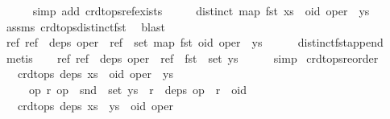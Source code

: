 \begin{isabellebody}
\ \ \ \ \isamarkupfalse%
\ {\isacharparenleft}simp\ add{\isacharcolon}\ crdt{\isacharunderscore}ops{\isacharunderscore}ref{\isacharunderscore}exists{\isacharparenright}\isanewline
\ \ \isamarkupfalse%
\ \isamarkupfalse%
\ {\isachardoublequoteopen}distinct\ {\isacharparenleft}map\ fst\ {\isacharparenleft}xs\ {\isacharat}\ {\isacharbrackleft}{\isacharparenleft}oid{\isacharcomma}\ oper{\isacharparenright}{\isacharbrackright}\ {\isacharat}\ ys{\isacharparenright}{\isacharparenright}{\isachardoublequoteclose}\isanewline
\ \ \ \ \isamarkupfalse%
\ assms\ crdt{\isacharunderscore}ops{\isacharunderscore}distinct{\isacharunderscore}fst\ \isamarkupfalse%
\ blast\isanewline
\ \ \isamarkupfalse%
\ \isamarkupfalse%
\ {\isachardoublequoteopen}{\isasymAnd}ref{\isachardot}\ ref\ {\isasymin}\ deps\ oper\ {\isasymLongrightarrow}\ ref\ {\isasymnotin}\ set\ {\isacharparenleft}map\ fst\ {\isacharparenleft}{\isacharbrackleft}{\isacharparenleft}oid{\isacharcomma}\ oper{\isacharparenright}{\isacharbrackright}\ {\isacharat}\ ys{\isacharparenright}{\isacharparenright}{\isachardoublequoteclose}\isanewline
\ \ \ \ \isamarkupfalse%
\ distinct{\isacharunderscore}fst{\isacharunderscore}append\ \isamarkupfalse%
\ metis\isanewline
\ \ \isamarkupfalse%
\ {\isachardoublequoteopen}{\isasymAnd}ref{\isachardot}\ ref\ {\isasymin}\ deps\ oper\ {\isasymLongrightarrow}\ ref\ {\isasymnotin}\ fst\ {\isacharbackquote}\ set\ ys{\isachardoublequoteclose}\isanewline
\ \ \ \ \isamarkupfalse%
\ simp\isanewline
{}\isamarkupfalse%
%
\endisatagproof
{\isafoldproof}%
%
\isadelimproof
\isanewline
%
\endisadelimproof
\isanewline
{}\isamarkupfalse%
\ crdt{\isacharunderscore}ops{\isacharunderscore}reorder{\isacharcolon}\isanewline
\ \ \ {\isachardoublequoteopen}crdt{\isacharunderscore}ops\ deps\ {\isacharparenleft}xs\ {\isacharat}\ {\isacharbrackleft}{\isacharparenleft}oid{\isacharcomma}\ oper{\isacharparenright}{\isacharbrackright}\ {\isacharat}\ ys{\isacharparenright}{\isachardoublequoteclose}\isanewline
\ \ \ \ \ {\isachardoublequoteopen}{\isasymAnd}op{}\ r{\isachardot}\ op{}\ {\isasymin}\ snd\ {\isacharbackquote}\ set\ ys\ {\isasymLongrightarrow}\ r\ {\isasymin}\ deps\ op{}\ {\isasymLongrightarrow}\ r\ {\isasymnoteq}\ oid{\isachardoublequoteclose}\isanewline
\ \ \ {\isachardoublequoteopen}crdt{\isacharunderscore}ops\ deps\ {\isacharparenleft}xs\ {\isacharat}\ ys\ {\isacharat}\ {\isacharbrackleft}{\isacharparenleft}oid{\isacharcomma}\ oper{\isacharparenright}{\isacharbrackright}{\isacharparenright}{\isachardoublequoteclose}\isanewline

\end{isabellebody}
